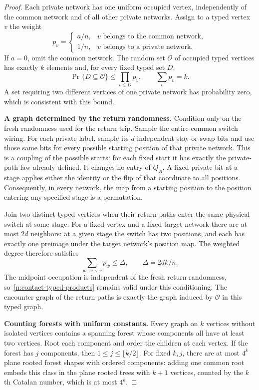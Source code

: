 \begin{proof}
Each private network has one uniform occupied vertex, independently
of the common network and of all other private networks.  Assign to
a typed vertex $v$ the weight
\[
 p_v=\begin{cases}
 a/n,&v\text{ belongs to the common network},\\
 1/n,&v\text{ belongs to a private network}.
 \end{cases}
\]
If $a=0$, omit the common network.  The random set $\mathcal O$ of
occupied typed vertices has exactly $k$ elements and, for every fixed
typed set $D$,
\begin{equation}\label{n:contact-typed-products}
 \Pr\{D\subseteq\mathcal O\}\le\prod_{v\in D}p_v,
 \qquad \sum_vp_v=k.
\end{equation}
A set requiring two different vertices of one private network has
probability zero, which is consistent with this bound.

\medskip\noindent\textbf{A graph determined by the return randomness.}\enspace
Condition only on the fresh randomness used for the return trip.
Sample the entire common switch wiring.  For each private label,
sample its $d$ independent stay-or-swap bits and use those same bits
for every possible starting position of that private network.  This
is a coupling of the possible starts: for each fixed start it has
exactly the private-path law already defined.  It changes no entry
of $Q_A$.  A fixed private bit at a stage applies either the identity
or the flip of that coordinate to all positions.  Consequently, in
every network, the map from a starting position to the position
entering any specified stage is a permutation.

Join two distinct typed vertices when their return paths enter the
same physical switch at some stage.  For a fixed vertex and a fixed
target network there are at most $2d$ neighbors: at a given stage
the switch has two positions, and each has exactly one preimage
under the target network's position map.  The weighted degree
therefore satisfies
\begin{equation}\label{n:contact-weighted-degree}
 \sum_{w:\,w\sim v}p_w\le\Delta,
 \qquad \Delta=2dk/n.
\end{equation}
The midpoint occupation is independent of the fresh return randomness,
so~\eqref{n:contact-typed-products} remains valid under this conditioning.
The encounter graph of the return paths is exactly the graph induced
by $\mathcal O$ in this typed graph.

\medskip\noindent\textbf{Counting forests with uniform constants.}\enspace
Every graph on $k$ vertices without isolated vertices contains a
spanning forest whose components all have at least two vertices.
Root each component and order the children at each vertex.  If the
forest has $j$ components, then $1\le j\le\lfloor k/2\rfloor$.
For fixed $k,j$, there are at most $4^k$ plane rooted forest shapes
with ordered components: adding one common root embeds this class
in the plane rooted trees with $k+1$ vertices, counted by the $k$th
Catalan number, which is at most $4^k$.


\end{proof}
